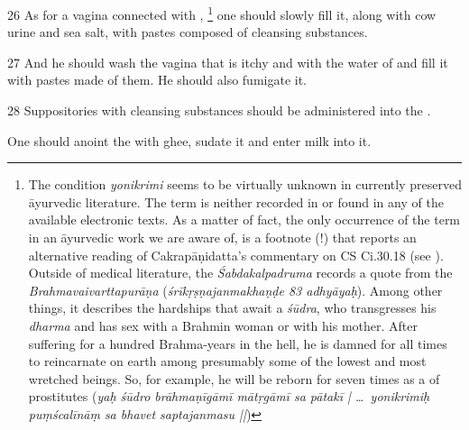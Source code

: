 \begin{translation}
\item [26]
As for a vagina connected with ,%
	\footnote{%
	The condition \textit{yonikrimi} seems to be virtually unknown in currently preserved  āyurvedic literature. The term is neither recorded in \textcite{josi-maha} or found in any of the available electronic texts. As a matter of fact, the only occurrence of the term in an āyurvedic work we are aware of, is a footnote (!) that reports an alternative reading of Cakrapāṇidatta's commentary on CS Ci.30.18 (see \textcite[635b]{cara-trikamji3}).
	Outside of medical literature, the \textit{Śabdakalpadruma} records a quote from the \textit{Brahmavaivarttapurāṇa} (\textit{śrīkṛṣṇajanmakhaṇḍe 83 adhyāyaḥ}). Among other things, it describes the hardships that await a \textit{śūdra}, who transgresses his \textit{dharma} and has sex with a Brahmin woman or with his mother. After suffering for a hundred Brahma-years in the hell, he is damned for all times to reincarnate on earth among presumably some of the lowest and most wretched beings. So, for example, he will be reborn for seven times as a  of prostitutes (\textit{yaḥ śūdro brāhmaṇīgāmī mātṛgāmī sa pātakī | \ldots\ yonikrimiḥ puṃścalīnāṃ sa bhavet saptajanmasu ||})     
	} 
one should slowly fill it, along with cow urine and sea salt, with pastes composed of cleansing substances.

\item [27]
And he should wash the vagina that is itchy and  with the water of  and fill it with pastes made of them. He should also fumigate it.

\item [28]
Suppositories with cleansing substances should be administered into the .

One should anoint the  with ghee, sudate it and enter milk into it. 


\end{translation}
